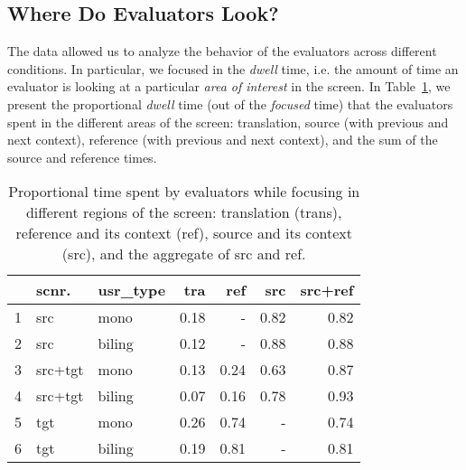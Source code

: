 

\vspace{10pt}
\subsection{Where Do Evaluators Look?}
\vspace{5pt}

The \eye data allowed us to analyze the behavior of the evaluators across different conditions. In particular, we focused in the \emph{dwell} time, i.e. the amount of time an evaluator is looking at a particular \emph{area of interest} in the screen. In Table~\ref{tab:aoi}, we present the proportional \emph{dwell} time (out of the \emph{focused} time) that the evaluators spent in the different areas of the screen: \Ni translation, \Nii source (with previous and next context), \Niii reference (with previous and next context), \Niv and the sum of the source and reference times.\\



\begin{table}[ht]
\centering
\small
\begin{tabular}{rllrrrr}
  \toprule
 & scnr. & usr\_type & tra & ref & src & src+ref \\ 
  \midrule
1 & src & mono & 0.18 & - & 0.82 & 0.82 \\ 
  2 & src & biling & 0.12 & - & 0.88 & 0.88 \\ 
  3 & src+tgt & mono & 0.13 & 0.24 & 0.63 & 0.87 \\ 
  4 & src+tgt & biling & 0.07 & 0.16 & 0.78 & 0.93 \\ 
  5 & tgt & mono & 0.26 & 0.74 & - & 0.74 \\ 
  6 & tgt & biling & 0.19 & 0.81 & - & 0.81 \\ 
   \bottomrule
\end{tabular}
\caption{\label{tab:aoi} Proportional time spent by evaluators while focusing in different regions of the screen: translation (trans), reference and its context (ref), source and its context (src), and the aggregate of src and ref.}
\end{table}

